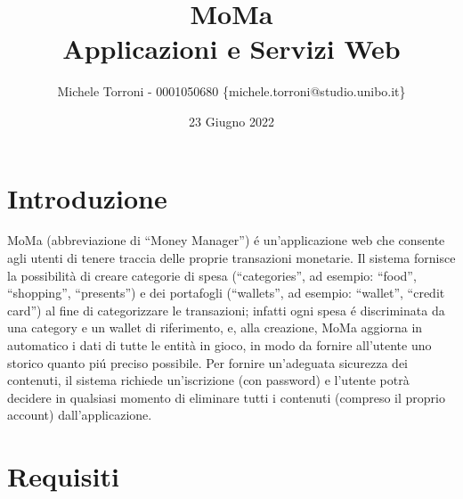 \documentclass{report}
\title{
    MoMa \\
    \large Applicazioni e Servizi Web
}
\author{Michele Torroni - 0001050680 \{michele.torroni@studio.unibo.it\}}
\date{23 Giugno 2022}
\begin{document}
\maketitle
\tableofcontents
\newpage
\linespread{1.2}


\section{Introduzione}
MoMa (abbreviazione di “Money Manager”) é un’applicazione web che consente agli utenti di tenere traccia delle proprie transazioni monetarie.
\newline
\newline
Il sistema fornisce la possibilità di creare categorie di spesa (“categories”, ad esempio: “food”, “shopping”, “presents”) e dei portafogli (“wallets”, ad esempio: “wallet”, “credit card”) al fine di categorizzare le transazioni; infatti ogni spesa é discriminata da una category e un wallet di riferimento, e, alla creazione, MoMa aggiorna in automatico i dati di tutte le entità in gioco, in modo da fornire all’utente uno storico quanto piú preciso possibile.
\newline
\newline
Per fornire un’adeguata sicurezza dei contenuti, il sistema richiede un’iscrizione (con password) e l’utente potrà decidere in qualsiasi momento di eliminare tutti i contenuti (compreso il proprio account) dall’applicazione.
\newpage

\section{Requisiti}
\end{document}
